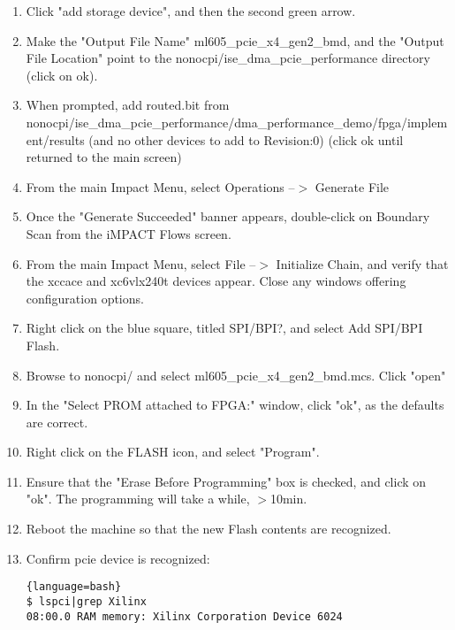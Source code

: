 \begin{enumerate}
\begin{itemize}
\end{itemize}
\item Click "add storage device", and then the second green arrow.
\item Make the "Output File Name" ml605\_pcie\_x4\_gen2\_bmd, and the "Output File Location" point to the nonocpi/ise\_dma\_pcie\_performance directory (click on ok).
\item When prompted, add routed.bit from nonocpi/ise\_dma\_pcie\_performance/dma\_performance\_demo/fpga/implement/results (and no other devices to add to Revision:0) (click ok until returned to the main screen)
\item From the main Impact Menu, select Operations --$>$ Generate File
\item Once the "Generate Succeeded" banner appears, double-click on Boundary Scan from the iMPACT Flows screen.
\item From the main Impact Menu, select File --$>$ Initialize Chain, and verify that the xccace and xc6vlx240t devices appear.  Close any windows offering configuration options.
\item Right click on the blue square, titled SPI/BPI?, and select Add SPI/BPI Flash.
\item Browse to nonocpi/ and select ml605\_pcie\_x4\_gen2\_bmd.mcs.  Click "open"
\item In the "Select PROM attached to FPGA:" window, click "ok", as the defaults are correct.
\item Right click on the FLASH icon, and select "Program".
\item Ensure that the "Erase Before Programming" box is checked, and click on "ok".  The programming will take a while, $>$10min.
\item Reboot the machine so that the new Flash contents are recognized.
\item Confirm pcie device is recognized:
\begin{lstlisting}{language=bash}
$ lspci|grep Xilinx
08:00.0 RAM memory: Xilinx Corporation Device 6024
\end{lstlisting}

\end{enumerate}
